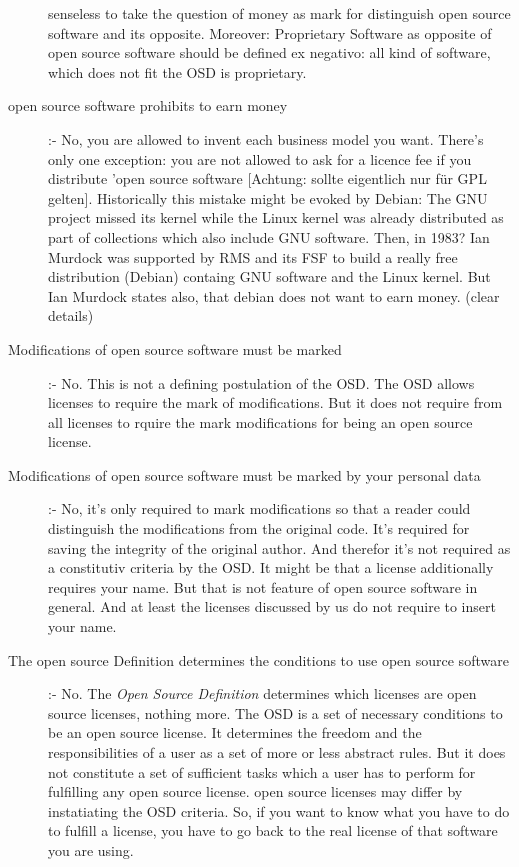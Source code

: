 \begin{description}
  senseless to take the question of money as mark for distinguish open source
  software and its opposite. Moreover: Proprietary Software as opposite of open
  source software should be defined ex negativo: all kind of software, which
  does not fit the OSD is proprietary.
  \item[open source software prohibits to earn money] :- No,
  you are allowed to invent each business model you want. There's only one
  exception: you are not allowed to ask for a licence fee if you distribute
  'open source software [Achtung: sollte eigentlich nur für GPL gelten].
  Historically this mistake might be evoked by Debian: The GNU project missed
  its kernel while the Linux kernel was already distributed as part of
  collections which also include GNU software. Then, in 1983? Ian Murdock was
  supported by RMS and its FSF to build a really free distribution (Debian)
  containg GNU software and the Linux kernel. But Ian Murdock states also, that
  debian does not want to earn money. (clear details)
  \item[Modifications of open source software must be marked] :- No. This is not
  a defining postulation of the OSD. The OSD allows licenses to require the mark
  of modifications. But it does not require from all licenses to rquire the mark
  modifications for being an open source license.
  \item[Modifications of open source software must be marked by your personal
  data] :- No, it's only required to mark modifications so that a reader could
  distinguish the modifications from the original code. It's required for saving
  the integrity of the original author. And therefor it's not required as a
  constitutiv criteria by the OSD. It might be that a license additionally
  requires your name. But that is not feature of open source software in general.
  And at least the licenses discussed by us do not require to insert your name.
  \item[The open source Definition determines the conditions to use open source
  software] :- No. The \emph{Open Source Definition} determines which licenses are open
  source licenses, nothing more. The OSD is a set of necessary conditions to be
  an open source license. It determines the freedom and the responsibilities of
  a user as a set of more or less abstract rules. But it does not constitute a
  set of sufficient tasks which a user has to perform for fulfilling any open
  source license. open source licenses may differ by instatiating the OSD
  criteria. So, if you want to know what you have to do to fulfill a license,
  you have to go back to the real license of that software you are using.
\end{description}

%
